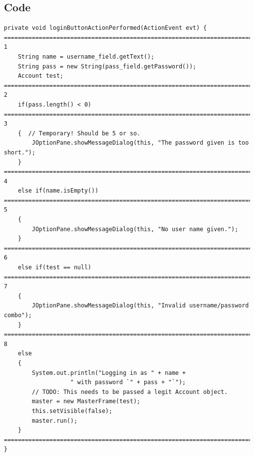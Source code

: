 \documentclass{article}
\begin{document}
\subsection{Code}
\begin{verbatim}
private void loginButtonActionPerformed(ActionEvent evt) {
===============================================================================
1
    String name = username_field.getText();
    String pass = new String(pass_field.getPassword());
    Account test;
===============================================================================
2
    if(pass.length() < 0) 
===============================================================================
3
    {  // Temporary! Should be 5 or so.
        JOptionPane.showMessageDialog(this, "The password given is too short.");
    }
===============================================================================
4
    else if(name.isEmpty())
===============================================================================
5
    {
        JOptionPane.showMessageDialog(this, "No user name given.");
    }
===============================================================================
6
    else if(test == null) 
===============================================================================
7
    {
    	JOptionPane.showMessageDialog(this, "Invalid username/password combo");
    }
===============================================================================
8
    else
    {
        System.out.println("Logging in as " + name +
    		       " with password `" + pass + "`");
        // TODO: This needs to be passed a legit Account object.
        master = new MasterFrame(test);
        this.setVisible(false);
        master.run();
    }
===============================================================================
}
\end{verbatim}
\end{document}
